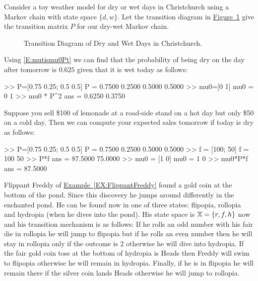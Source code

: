 {%
\begin{example}\label{EX:DryWetChain}
Consider a toy weather model for dry or wet days in Christchurch using a Markov chain with state space $\{d,w\}$.  Let the transition diagram in \hyperref[F:DryWetTransDiag]{Figure~\ref*{F:DryWetTransDiag}} give the transition matrix $P$ for our dry-wet Markov chain.  
\begin{figure}[htpb]
\caption{Transition Diagram of Dry and Wet Days in Christchurch.\label{F:DryWetTransDiag}}
\centering   {}
\end{figure}
Using \eqref{E:mutismu0Pt} we can find that the probability of being dry on the day after tomorrow is $0.625$ given that it is wet today as follows:
\begin{VrbM}
>> P=[0.75 0.25; 0.5 0.5] %
P =
    0.7500    0.2500
    0.5000    0.5000
>> mu0=[0 1] %
mu0 =     0     1
>> mu0 * P^2 %
ans =    0.6250    0.3750
\end{VrbM}
Suppose you sell \$100 of lemonade at a road-side stand on a hot day but only \$50 on a cold day.  Then we can compute your expected sales tomorrow if today is dry as follows:
\begin{VrbM}
>> P=[0.75 0.25; 0.5 0.5] %
P =
    0.7500    0.2500
    0.5000    0.5000
>> f = [100; 50] %
f =
   100
    50
>> P*f %
ans =
   87.5000
   75.0000 
>> mu0 = [1 0] %
mu0 =     1     0
>> mu0*P*f %
ans =   87.5000
\end{VrbM}
\end{example}

\begin{exercise}\label{EXR:FreddyGoldCoin}
Flippant Freddy of \hyperref[EX:FlippantFreddy]{Example~\ref*{EX:FlippantFreddy}} found a gold coin at the bottom of the pond.  Since this discovery he  jumps around differently in the enchanted pond.  He can be found now in one of three states: flipopia, rollopia and hydropia (when he dives into the pond). His state space is $\mathbb{X}=\{r,f,h\}$ now and his transition mechanism is as follows: If he rolls an odd number with his fair die in rollopia he will jump to flipopia but if he rolls an even number then he will stay in rollopia only if the outcome is $2$ otherwise he will dive into hydropia.  If the fair gold coin toss at the bottom of hydropia is Heads then Freddy will swim to flipopia otherwise he will remain in hydropia. Finally, if he is in flipopia he will remain there if the silver coin lands Heads otherwise he will jump to rollopia.


\end{exercise}}
